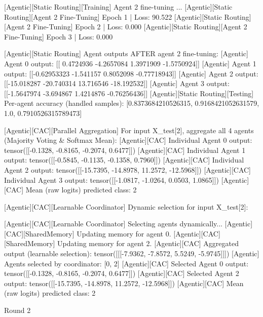 [Agentic][Static Routing][Training] Agent 2 fine-tuning ...
[Agentic][Static Routing][Agent 2 Fine-Tuning] Epoch 1 | Loss: 90.522
[Agentic][Static Routing][Agent 2 Fine-Tuning] Epoch 2 | Loss: 0.000
[Agentic][Static Routing][Agent 2 Fine-Tuning] Epoch 3 | Loss: 0.000

[Agentic][Static Routing] Agent outputs AFTER agent 2 fine-tuning:
[Agentic] Agent 0 output: [[ 0.4724936 -4.2657084  1.3971909 -1.5750924]]
[Agentic] Agent 1 output: [[-0.62953323 -1.541157    0.8052098  -0.77718943]]
[Agentic] Agent 2 output: [[-15.018287 -20.740314  13.716546 -18.192532]]
[Agentic] Agent 3 output: [[-1.5647974  -3.694867    1.4214876  -0.76256436]]
[Agentic][Static Routing][Testing] Per-agent accuracy (handled samples): [0.8373684210526315, 0.9168421052631579, 1.0, 0.7910526315789473]

[Agentic][CAC][Parallel Aggregation] For input X_test[2], aggregate all 4 agents (Majority Voting & Softmax Mean):
[Agentic][CAC] Individual Agent 0 output: tensor([[-0.1328, -0.8165, -0.2074,  0.6477]])
[Agentic][CAC] Individual Agent 1 output: tensor([[-0.5845, -0.1135, -0.1358,  0.7960]])
[Agentic][CAC] Individual Agent 2 output: tensor([[-15.7395, -14.8978,  11.2572, -12.5968]])
[Agentic][CAC] Individual Agent 3 output: tensor([[-1.0817, -1.0264,  0.0503,  1.0865]])
[Agentic][CAC] Mean (raw logits) predicted class: 2

[Agentic][CAC][Learnable Coordinator] Dynamic selection for input X_test[2]:

[Agentic][CAC][Learnable Coordinator] Selecting agents dynamically...
[Agentic][CAC][SharedMemory] Updating memory for agent 0.
[Agentic][CAC][SharedMemory] Updating memory for agent 2.
[Agentic][CAC] Aggregated output (learnable selection): tensor([[[-7.9362, -7.8572,  5.5249, -5.9745]]])
[Agentic] Agents selected by coordinator: [0, 2]
[Agentic][CAC] Selected Agent 0 output: tensor([[-0.1328, -0.8165, -0.2074,  0.6477]])
[Agentic][CAC] Selected Agent 2 output: tensor([[-15.7395, -14.8978,  11.2572, -12.5968]])
[Agentic][CAC] Mean (raw logits) predicted class: 2

Round 2

